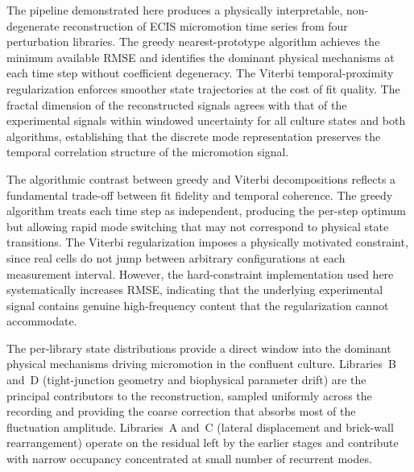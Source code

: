\documentclass[english, 10pt, a4paper]{article}
\begin{document}
The pipeline demonstrated here produces a physically interpretable, non-degenerate reconstruction of ECIS micromotion time series from four perturbation libraries. The greedy nearest-prototype algorithm achieves the minimum available RMSE and identifies the dominant physical mechanisms at each time step without coefficient degeneracy. The Viterbi temporal-proximity regularization enforces smoother state trajectories at the cost of fit quality. The fractal dimension of the reconstructed signals agrees with that of the experimental signals within windowed uncertainty for all culture states and both algorithms, establishing that the discrete mode representation preserves the temporal correlation structure of the micromotion signal.

The algorithmic contrast between greedy and Viterbi decompositions reflects a fundamental trade-off between fit fidelity and temporal coherence. The greedy algorithm treats each time step as independent, producing the per-step optimum but allowing rapid mode switching that may not correspond to physical state transitions. The Viterbi regularization imposes a physically motivated constraint, since real cells do not jump between arbitrary configurations at each measurement interval. However, the hard-constraint implementation used here systematically increases RMSE, indicating that the underlying experimental signal contains genuine high-frequency content that the regularization cannot accommodate. 


The per-library state distributions provide a direct window into the dominant physical mechanisms driving micromotion in the confluent culture. Libraries~B and~D (tight-junction geometry and biophysical parameter drift) are the principal contributors to the reconstruction, sampled uniformly across the recording and providing the coarse correction that absorbs most of the fluctuation amplitude. Libraries~A and~C (lateral displacement and brick-wall rearrangement) operate on the residual left by the earlier stages and contribute with narrow occupancy concentrated at small number of recurrent modes. 
\end{document}
